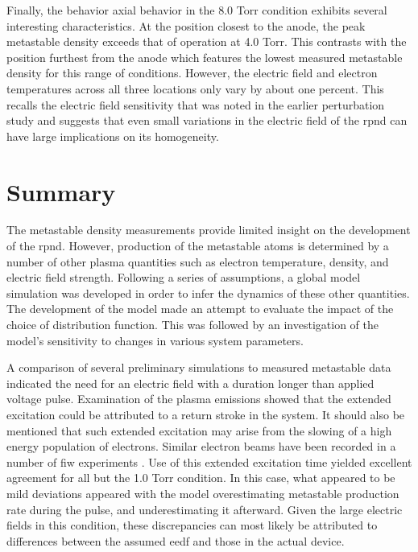 Finally, the behavior axial behavior in the 8.0 Torr condition exhibits several
interesting characteristics. At the position closest to the anode, the peak
metastable density exceeds that of operation at 4.0 Torr. This contrasts with
the position furthest from the anode which features the lowest measured
metastable density for this range of conditions. However, the electric field and
electron temperatures across all three locations only vary by about one percent.
This recalls the electric field sensitivity that was noted in the earlier
perturbation study and suggests that even small variations in the electric field
of the \acs{rpnd} can have large implications on its homogeneity.

\section{Summary}

The metastable density measurements provide limited insight on the development
of the \acs{rpnd}. However, production of the metastable atoms is determined by
a number of other plasma quantities such as electron temperature, density, and
electric field strength. Following a series of assumptions, a global model
simulation was developed in order to infer the dynamics of these other
quantities. The development of the model made an attempt to evaluate the impact
of the choice of distribution function. This was followed by an investigation of
the model's sensitivity to changes in various system parameters.

A comparison of several preliminary simulations to measured metastable data
indicated the need for an electric field with a duration longer than applied
voltage pulse. Examination of the plasma emissions showed that the extended
excitation could be attributed to a return stroke in the system. It should also
be mentioned that such extended excitation may arise from the slowing of a high
energy population of electrons. Similar electron beams have been recorded in a
number of \acs{fiw} experiments \cite{Yatom2011, Vasilyak1994, Macheret2002,
Bychkov1978}. Use of this extended excitation time yielded excellent agreement
for all but the 1.0 Torr condition. In this case, what appeared to be mild
deviations appeared with the model overestimating metastable production rate
during the pulse, and underestimating it afterward. Given the large electric
fields in this condition, these discrepancies can most likely be attributed to
differences between the assumed \acs{eedf} and those in the actual device.

